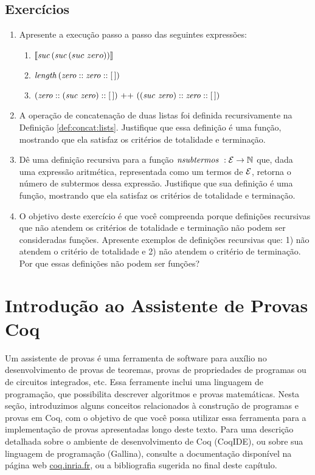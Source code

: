 \subsection{Exerc\'icios}

\begin{enumerate}
  \item Apresente a execu\c{c}\~ao passo a passo das seguintes express\~oes:
  \begin{enumerate}
    \item $\llbracket \textit{suc\/}\, (\textit{suc\/}\, (suc\,\,zero))\rrbracket$ 
    \item $\textit{length\/}\, (\textit{zero\/} :: \textit{zero\/} :: [\,])$
    \item $(\textit{zero\/} :: (\textit{suc\/}\,\, \textit{zero\/}) ::[\,])\text{ ++ }((\textit{suc\/}\,\,\textit{zero\/}) :: \textit{zero\/} :: [\,])$
  \end{enumerate}
  \item A operação de concatenação de duas listas foi definida recursivamente na Definição \ref{def:concat:lists}. Justifique que essa definição é uma fun\c{c}\~ao, mostrando que ela satisfaz  os critérios de totalidade e termina\c{c}\~ao.
  \item Dê uma defini\c{c}\~ao recursiva para a função $\textit{nsubtermos }: \mathcal{E} \rightarrow \mathbb{N}$ que, dada uma express\~ao aritm\'etica, representada como um termos de $\mathcal{E}$, retorna o número de subtermos dessa expressão. Justifique que sua definição é uma função, mostrando que ela satisfaz os critérios de totalidade e termina\c{c}\~ao.
  \item O objetivo deste exerc\'icio \'e que você compreenda porque defini\c{c}\~oes recursivas que n\~ao atendem os crit\'erios de totalidade e termina\c{c}\~ao n\~ao podem ser consideradas fun\c{c}\~oes. 
        Apresente exemplos de defini\c{c}\~oes recursivas que: 1) n\~ao atendem o crit\'erio de totalidade e 2) n\~ao atendem o crit\'erio de termina\c{c}\~ao. Por que essas definições n\~ao podem ser fun\c{c}\~oes?        
\end{enumerate}

\section{Introdu\c{c}\~ao ao Assistente de Provas Coq}\label{cap1:coq}

Um assistente de provas \'e uma ferramenta de software para auxílio no desenvolvimento de provas de teoremas, provas de propriedades de programas ou de circuitos integrados, etc. Essa ferramente inclui uma linguagem de programa\c{c}\~ao, que possibilita descrever  algoritmos e provas matem\'aticas. Nesta seção, introduzimos alguns conceitos relacionados à construção de programas e provas em Coq, com o objetivo de que você possa utilizar essa ferramenta para a implementação de provas apresentadas longo deste texto. Para uma descrição detalhada sobre o ambiente de desenvolvimento de Coq (CoqIDE), ou sobre sua linguagem de programação (Gallina), consulte a documentação disponível na página web \url{coq.inria.fr}, ou a bibliografia sugerida no final deste capítulo. 

